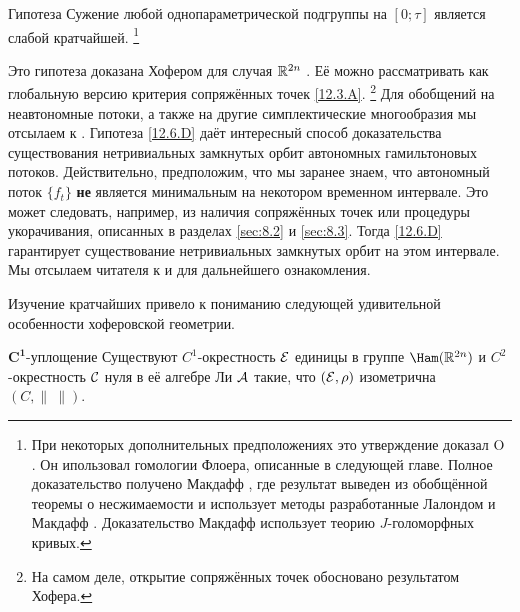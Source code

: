 \begin{thm}{Гипотеза}\label{12.6.D}
Сужение любой однопараметрической подгруппы на $[0;\tau]$ является
слабой кратчайшей.%
\footnote{
При некоторых дополнительных предположениях это утверждение доказал O \cite{O01}.
Он ипользовал гомологии Флоера, описанные в следующей главе.
Полное доказательство получено Макдафф \cite[Proposition 1.5(i)]{McD01}, где результат выведен из обобщённой теоремы о несжимаемости и использует методы разработанные Лалондом и Макдафф \cite{LM2}.
Доказательство Макдафф использует теорию $J$-голоморфных кривых.
\dpp}

\end{thm}

Это гипотеза доказана Хофером для случая $\mathbb{R}^{2n}$ \cite{H2}. 
Её можно рассматривать как глобальную версию критерия сопряжённых точек \ref{12.3.A}.%
\footnote{На самом деле, открытие сопряжённых точек обосновано результатом Хофера.}  
Для обобщений на неавтономные потоки, а также на другие симплектические многообразия мы отсылаем к
\cite{BP1,
  Si1,LM2,Sch3,MSl}. 
Гипотеза \ref{12.6.D} даёт интересный способ доказательства
существования нетривиальных замкнутых орбит автономных гамильтоновых
потоков.  
Действительно, предположим, что мы заранее знаем, что автономный поток
$\{f_t\}$ \textbf{не} является минимальным на некотором временном
интервале. 
Это может следовать, например, из наличия сопряжённых точек или
процедуры укорачивания, описанных в разделах \ref{sec:8.2} и
\ref{sec:8.3}.  
Тогда \ref{12.6.D} гарантирует существование нетривиальных замкнутых
орбит на этом интервале.  
Мы отсылаем читателя к \cite{LM2} и \cite{P8} для
дальнейшего ознакомления.  

Изучение кратчайших привело к пониманию следующей удивительной
особенности хоферовской геометрии.

\begin{thm}[\cite{BP1}.]{$\bm{C^1}$-уплощение}
\label{12.6.E}
Существуют $C^1$-окрестность $\mathcal{E}$ единицы в группе $\Ham(\RR^{2n})$ и $C^2$-окрестность $\mathcal{C}$ нуля в её алгебре Ли $\mathcal{A}$ такие, что $(\mathcal{E},\rho)$ изометрична $(C, \|\ \|)$. 
\end{thm}

